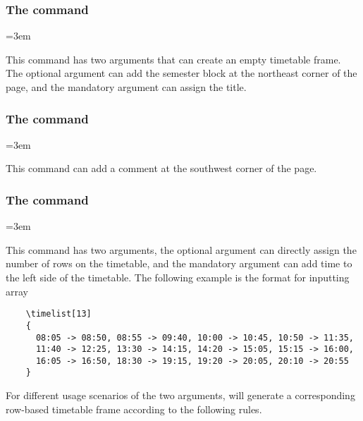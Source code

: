 \documentclass[letterpaper]{l3doc}
\newenvironment{example}{\begin{list}{}{\leftmargin=3em}\item }{\end{list}}
\begin{document}
\subsubsection{The  command}

\begin{example}
    \qquad
\end{example}

This command has two arguments that can create an empty timetable frame. The optional argument can add the semester block at the northeast corner of the page, and the mandatory argument can assign the title.

\subsubsection{The  command}

\begin{example}
\end{example}

This command can add a comment at the southwest corner of the page.

\subsubsection{The  command}

\begin{example}
    \qquad
\end{example}

This command has two arguments, the optional argument can directly assign the number of rows on the timetable, and the mandatory argument can add time to the left side of the timetable. The following example is the format for inputting array

\begin{Verbatim}
    \timelist[13]
    {
      08:05 -> 08:50, 08:55 -> 09:40, 10:00 -> 10:45, 10:50 -> 11:35,
      11:40 -> 12:25, 13:30 -> 14:15, 14:20 -> 15:05, 15:15 -> 16:00,
      16:05 -> 16:50, 18:30 -> 19:15, 19:20 -> 20:05, 20:10 -> 20:55
    }
\end{Verbatim}

For different usage scenarios of the two arguments,  will generate a corresponding row-based timetable frame according to the following rules.
\end{document}
